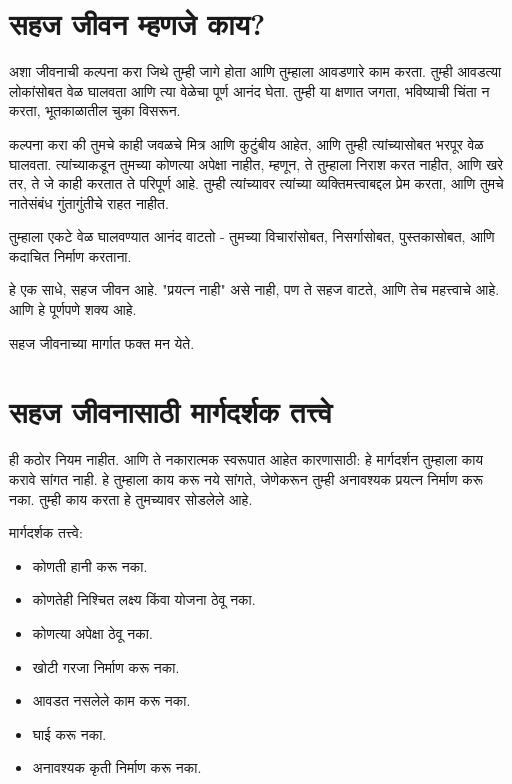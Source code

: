 \chapter{ सहज जीवन म्हणजे काय?}

अशा जीवनाची कल्पना करा जिथे तुम्ही जागे होता आणि तुम्हाला आवडणारे काम करता. तुम्ही आवडत्या लोकांसोबत वेळ घालवता आणि त्या वेळेचा पूर्ण आनंद घेता. तुम्ही या क्षणात जगता, भविष्याची चिंता न करता, भूतकाळातील चुका विसरून.

कल्पना करा की तुमचे काही जवळचे मित्र आणि कुटुंबीय आहेत, आणि तुम्ही त्यांच्यासोबत भरपूर वेळ घालवता. त्यांच्याकडून तुमच्या कोणत्या अपेक्षा नाहीत, म्हणून, ते तुम्हाला निराश करत नाहीत, आणि खरे तर, ते जे काही करतात ते परिपूर्ण आहे. तुम्ही त्यांच्यावर त्यांच्या व्यक्तिमत्त्वाबद्दल प्रेम करता, आणि तुमचे नातेसंबंध गुंतागुंतीचे राहत नाहीत.

तुम्हाला एकटे वेळ घालवण्यात आनंद वाटतो - तुमच्या विचारांसोबत, निसर्गासोबत, पुस्तकासोबत, आणि कदाचित निर्माण करताना.

हे एक साधे, सहज जीवन आहे. "प्रयत्न नाही" असे नाही, पण ते सहज वाटते, आणि तेच महत्त्वाचे आहे. आणि हे पूर्णपणे शक्य आहे.

सहज जीवनाच्या मार्गात फक्त मन येते.

\chapter{सहज जीवनासाठी मार्गदर्शक तत्त्वे}

ही कठोर नियम नाहीत. आणि ते नकारात्मक स्वरूपात आहेत कारणासाठी: हे मार्गदर्शन तुम्हाला काय करावे सांगत नाही. हे तुम्हाला काय करू नये सांगते, जेणेकरून तुम्ही अनावश्यक प्रयत्न निर्माण करू नका. तुम्ही काय करता हे तुमच्यावर सोडलेले आहे.

मार्गदर्शक तत्त्वे:
\begin{itemize}
\item कोणती हानी करू नका.
\item कोणतेही निश्चित लक्ष्य किंवा योजना ठेवू नका.
\item कोणत्या अपेक्षा ठेवू नका.
\item खोटी गरजा निर्माण करू नका.
\item आवडत नसलेले काम करू नका.
\item घाई करू नका.
\item अनावश्यक कृती निर्माण करू नका.
\end{itemize}


